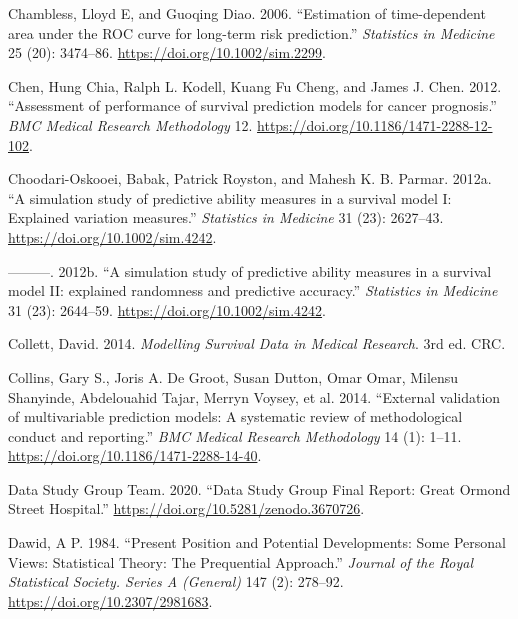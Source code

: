 \documentclass[
  letterpaper,
]{scrbook}
\newlength{\cslhangindent}
\newlength{\cslentryspacingunit} %
\newenvironment{CSLReferences}[2] %
 {%
  \setlength{\parindent}{0pt}
  \ifodd #1
  \let\oldpar\par
  \def\par{\hangindent=\cslhangindent\oldpar}
  \fi
  \setlength{\parskip}{#2\cslentryspacingunit}
 }%
 {}
\theoremstyle{plain}
\theoremstyle{definition}
\theoremstyle{remark}
\begin{document}
\begin{CSLReferences}{1}{0}
\leavevmode{}%
Chambless, Lloyd E, and Guoqing Diao. 2006. {``{Estimation of
time-dependent area under the ROC curve for long-term risk
prediction}.''} \emph{Statistics in Medicine} 25 (20): 3474--86.
\url{https://doi.org/10.1002/sim.2299}.

\leavevmode{}%
Chen, Hung Chia, Ralph L. Kodell, Kuang Fu Cheng, and James J. Chen.
2012. {``{Assessment of performance of survival prediction models for
cancer prognosis}.''} \emph{BMC Medical Research Methodology} 12.
\url{https://doi.org/10.1186/1471-2288-12-102}.

\leavevmode{}%
Choodari-Oskooei, Babak, Patrick Royston, and Mahesh K. B. Parmar.
2012a. {``{A simulation study of predictive ability measures in a
survival model I: Explained variation measures}.''} \emph{Statistics in
Medicine} 31 (23): 2627--43. \url{https://doi.org/10.1002/sim.4242}.

\leavevmode{}%
---------. 2012b. {``{A simulation study of predictive ability measures
in a survival model II: explained randomness and predictive
accuracy}.''} \emph{Statistics in Medicine} 31 (23): 2644--59.
\url{https://doi.org/10.1002/sim.4242}.

\leavevmode{}%
Collett, David. 2014. \emph{{Modelling Survival Data in Medical
Research}}. 3rd ed. CRC.

\leavevmode{}%
Collins, Gary S., Joris A. De Groot, Susan Dutton, Omar Omar, Milensu
Shanyinde, Abdelouahid Tajar, Merryn Voysey, et al. 2014. {``{External
validation of multivariable prediction models: A systematic review of
methodological conduct and reporting}.''} \emph{BMC Medical Research
Methodology} 14 (1): 1--11.
\url{https://doi.org/10.1186/1471-2288-14-40}.

\leavevmode{}%
Data Study Group Team. 2020. {``{Data Study Group Final Report: Great
Ormond Street Hospital.}''}
\url{https://doi.org/10.5281/zenodo.3670726}.

\leavevmode{}%
Dawid, A P. 1984. {``{Present Position and Potential Developments: Some
Personal Views: Statistical Theory: The Prequential Approach}.''}
\emph{Journal of the Royal Statistical Society. Series A (General)} 147
(2): 278--92. \url{https://doi.org/10.2307/2981683}.


\end{CSLReferences}
\end{document}
